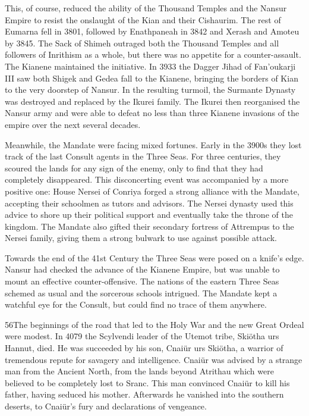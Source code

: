 \documentclass[]{book}
\begin{document}
This, of course, reduced the ability of the Thousand Temples and the Nansur Empire
to resist the onslaught of the Kian and their Cishaurim. The rest of Eumarna fell in
3801, followed by Enathpaneah in 3842 and Xerash and Amoteu by 3845. The Sack of
Shimeh outraged both the Thousand Temples and all followers of Inrithism as a whole,
but there was no appetite for a counter-assault. The Kianene maintained the initiative.
In 3933 the Dagger Jihad of Fan'oukarji III saw both Shigek and Gedea fall to the
Kianene, bringing the borders of Kian to the very doorstep of Nansur. In the resulting
turmoil, the Surmante Dynasty was destroyed and replaced by the Ikurei family. The
Ikurei then reorganised the Nansur army and were able to defeat no less than three
Kianene invasions of the empire over the next several decades.

Meanwhile, the Mandate were facing mixed fortunes. Early in the 3900s they lost track
of the last Consult agents in the Three Seas. For three centuries, they scoured the lands
for any sign of the enemy, only to find that they had completely disappeared. This
disconcerting event was accompanied by a more positive one: House Nersei of Conriya
forged a strong alliance with the Mandate, accepting their schoolmen as tutors and
advisors. The Nersei dynasty used this advice to shore up their political support and
eventually take the throne of the kingdom. The Mandate also gifted their secondary
fortress of Attrempus to the Nersei family, giving them a strong bulwark to use against
possible attack.

Towards the end of the 41st Century the Three Seas were posed on a knife's edge.
Nansur had checked the advance of the Kianene Empire, but was unable to mount an
effective counter-offensive. The nations of the eastern Three Seas schemed as usual and
the sorcerous schools intrigued. The Mandate kept a watchful eye for the Consult, but
could find no trace of them anywhere.

56The beginnings of the road that led to the Holy War and the new Great Ordeal were
modest. In 4079 the Scylvendi leader of the Utemot tribe, Skiötha urs Hannut, died.
He was succeeded by his son, Cnaiür urs Skiötha, a warrior of tremendous repute for
savagery and intelligence. Cnaiür was advised by a strange man from the Ancient
North, from the lands beyond Atrithau which were believed to be completely lost to
Sranc. This man convinced Cnaiür to kill his father, having seduced his mother.
Afterwards he vanished into the southern deserts, to Cnaiür's fury and declarations of
vengeance.
\end{document}
